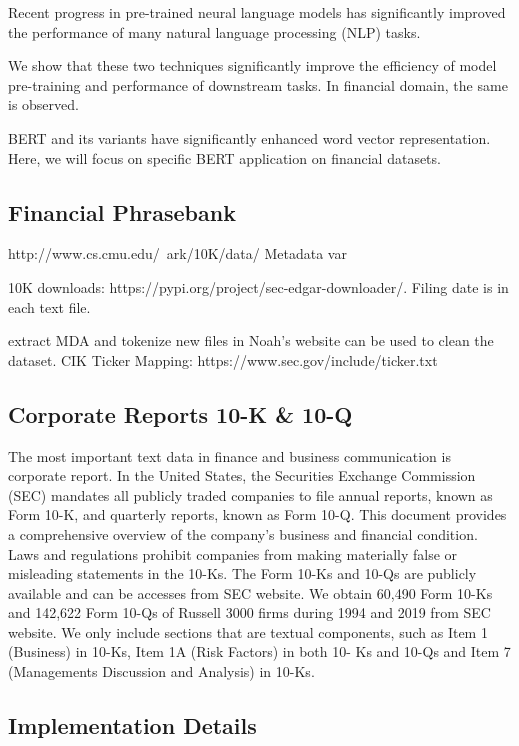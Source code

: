 \documentclass[11pt]{article}
\begin{document}
Recent progress in pre-trained neural language models has significantly improved the performance of many natural language processing (NLP) tasks.

We show that these two techniques significantly improve the efficiency of
model pre-training and performance of downstream tasks. In financial
domain, the same is observed.

BERT and its variants have significantly enhanced word vector representation. Here, we will focus on specific BERT application on financial
datasets.


\subsection{Financial Phrasebank}


http://www.cs.cmu.edu/~ark/10K/data/
Metadata var

10K downloads: https://pypi.org/project/sec-edgar-downloader/. Filing
date is in each text file.

extract MDA and tokenize new files in Noah's website can be used to clean the dataset.
CIK Ticker Mapping: https://www.sec.gov/include/ticker.txt



\subsection{Corporate Reports 10-K \& 10-Q} The most important text data in finance and business communication is corporate report. In the United States,
the Securities Exchange Commission (SEC) mandates all publicly traded companies to file annual
reports, known as Form 10-K, and quarterly reports, known as Form 10-Q. This document provides a comprehensive overview of the company’s
business and financial condition. Laws and regulations prohibit companies from making materially
false or misleading statements in the 10-Ks. The
Form 10-Ks and 10-Qs are publicly available and can be accesses from
SEC website. We obtain 60,490 Form 10-Ks and 142,622
Form 10-Qs of Russell 3000 firms during 1994 and
2019 from SEC website. We only include sections that are textual components, such as Item 1 (Business) in 10-Ks, Item 1A (Risk Factors) in both 10-
Ks and 10-Qs and Item 7 (Managements Discussion and Analysis) in 10-Ks.

\subsection{Implementation Details}
\end{document}
